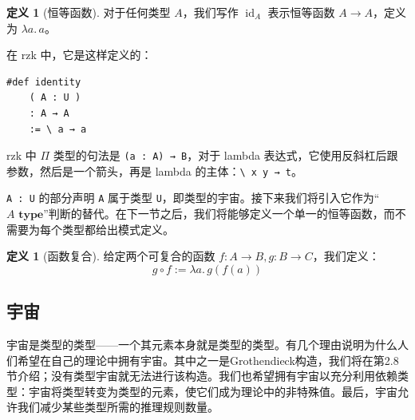 \documentclass{ctexrep}
\theoremstyle{plain}
\theoremstyle{definition}
\newtheorem{definition}[theorem]{定义}
\theoremstyle{remark}
\theoremstyle{definition}
\theoremstyle{definition}
\theoremstyle{definition}
\newcommand{\coloneqq}{\mathrel{:=}}
\begin{document}
\begin{definition}[恒等函数]
对于任何类型 $A$，我们写作 $\operatorname{id}_A$ 表示恒等函数 $A \to A$，定义为 $\lambda a.\,a$。

在 \textsf{rzk} 中，它是这样定义的：
\begin{verbatim}
#def identity
    ( A : U )
    : A → A
    := \ a → a
\end{verbatim}
\end{definition}

\textsf{rzk} 中 $\Pi$ 类型的句法是 \verb|(a : A) → B|，对于 lambda 表达式，它使用反斜杠后跟参数，然后是一个箭头，再是 lambda 的主体：\verb|\ x y → t|。

\verb|A : U| 的部分声明 \verb|A| 属于类型 \verb|U|，即类型的宇宙。接下来我们将引入它作为“$A \textbf{ type}$”判断的替代。在下一节之后，我们将能够定义一个单一的恒等函数，而不需要为每个类型都给出模式定义。

\begin{definition}[函数复合]
给定两个可复合的函数 $f:A\to B, g:B\to C$，我们定义：
\[
g\circ f \coloneqq \lambda a.\,g(f(a))
\]
\end{definition}

\subsection{宇宙}

宇宙是类型的类型——一个其元素本身就是类型的类型。有几个理由说明为什么人们希望在自己的理论中拥有宇宙。其中之一是Grothendieck构造，我们将在第2.8节介绍；没有类型宇宙就无法进行该构造。我们也希望拥有宇宙以充分利用依赖类型：宇宙将类型转变为类型的元素，使它们成为理论中的非特殊值。最后，宇宙允许我们减少某些类型所需的推理规则数量。
\end{document}

